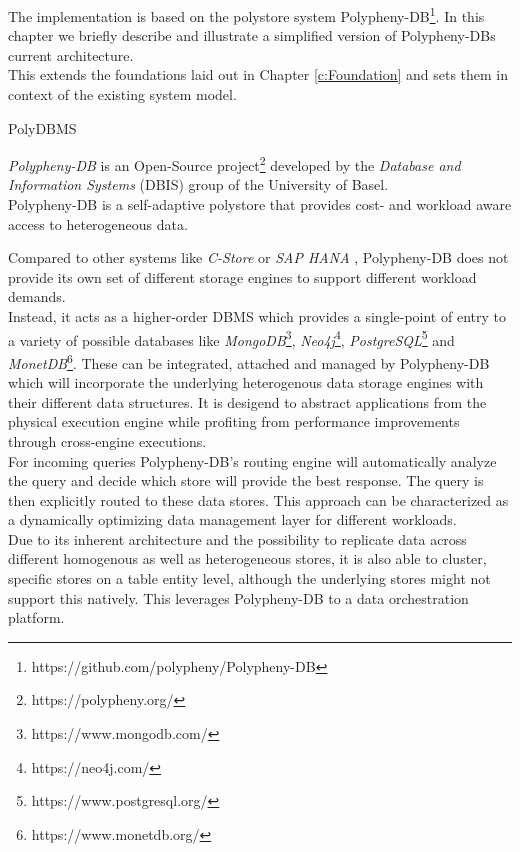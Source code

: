 The implementation is based on the polystore system Polypheny-DB\footnote{https://github.com/polypheny/Polypheny-DB}.
In this chapter we briefly describe and illustrate a simplified version of Polypheny-DBs current architecture.\\
This extends the foundations laid out in Chapter \ref{c:Foundation} and sets them in context of the existing system model.


PolyDBMS \cite{polypheny2021}

\textit{Polypheny-DB} is an Open-Source project\footnote{https://polypheny.org/} developed by 
the \textit{Database and Information Systems} (DBIS) group of the University of Basel.\\

Polypheny-DB is a self-adaptive polystore that provides cost- and workload aware access to heterogeneous data\cite{poly2020}.

Compared to other systems like \textit{C-Store}\cite{cstore_2005} or \textit{SAP HANA} \cite{hana_2012}, 
Polypheny-DB does not provide its own set of different storage engines to support 
different workload demands.\\
Instead, it acts as a higher-order DBMS which provides a single-point of entry to 
a variety of possible databases like 
\textit{MongoDB}\footnote{https://www.mongodb.com/}, 
\textit{Neo4j}\footnote{https://neo4j.com/},
\textit{PostgreSQL}\footnote{https://www.postgresql.org/} 
and \textit{MonetDB}\footnote{https://www.monetdb.org/}. 
These can be integrated, attached and managed by Polypheny-DB which will incorporate the underlying 
heterogenous data storage engines with their different data structures. 
It is desigend to abstract applications from the physical execution engine while profiting from 
performance improvements through cross-engine executions. 
\\
For incoming queries Polypheny-DB's routing engine will automatically analyze the query and decide 
which store will provide the best response. The query is then explicitly routed to these data stores. 
This approach can be characterized as a dynamically optimizing data management layer for different workloads.\\
Due to its inherent architecture and the possibility to replicate data across different homogenous as well as heterogeneous stores, it is also able to cluster, specific stores 
on a table entity level, although the underlying stores might not support this natively. 
This leverages Polypheny-DB to a data orchestration platform. 



